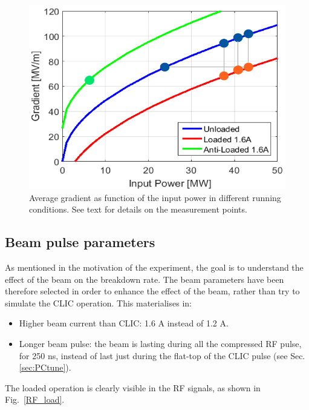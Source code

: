 \begin{figure}[t]
\centering 
\includegraphics[scale=0.7]{pictures/grad_vs_inPow.png}
\caption{Average gradient as function of the input power in different running conditions. See text for details on the measurement points. }
\label{g_IP}
\end{figure}


\subsection[Beam pulse parameters]{Beam pulse parameters}

As mentioned in the motivation of the experiment, the goal is to understand the effect of the beam on the breakdown rate. The beam parameters have been therefore selected in order to enhance the effect of the beam, rather than try to simulate the CLIC operation. This materialises in:
\begin{itemize}
\item Higher beam current than CLIC: 1.6 A instead of 1.2 A.
\item Longer beam pulse: the beam is lasting during all the compressed RF pulse, for 250 ns, instead of last just during the flat-top of the CLIC pulse (see Sec. \ref{sec:PCtune}).
\end{itemize}

\noindent
The loaded operation is clearly visible  in the RF signals, as shown in Fig.~\ref{RF_load}.

